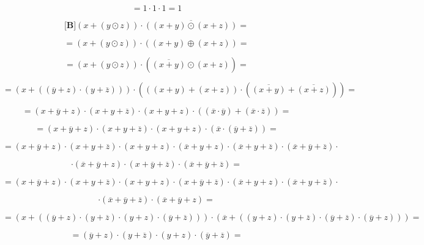 \begin{enumerate}
\begin{enumerate}
\begin{enumerate}
\begin{enumerate}
        \[{= {{1 \cdot 1} \cdot 1}} = 1\]

        \[{\lbrack\mathbf{B}\rbrack}{{{({x + {({y \odot z})}})} \cdot \overline{({{({x+y})}\odot{({x+z})}})}} =}\]

        \[{= {{({x + {({y \odot z})}})} \cdot {({{({x + y})} \oplus {({x + z})}})}}} =\]

        \[{= {{({x + {({y \odot z})}})} \cdot {({\overline{({x+y})} \odot {({x + z})}})}}} =\]

        \[{= {{({x + {({{({\overline{y} + z})} \cdot {({y + \overline{z}})}})}})} \cdot {({{({{({x + y})} + {({x + z})}})} \cdot {({\overline{({x+y})} + \overline{({x+z})}})}})}}} =\]

        \[{= {{{{({{x + \overline{y}} + z})} \cdot {({{x + y} + \overline{z}})}} \cdot {({{x + y} + z})}} \cdot \left( {\left( {\overline{x} \cdot \overline{y}} \right) + \left( {\overline{x} \cdot \overline{z}} \right)} \right)}} =\]

        \[{= {{{{({{x + \overline{y}} + z})} \cdot {({{x + y} + \overline{z}})}} \cdot {({{x + y} + z})}} \cdot {({\overline{x} \cdot {({\overline{y} + \overline{z}})}})}}} =\]

        \[= {{{{{{{({{x + \overline{y}} + z})} \cdot {({{x + y} + \overline{z}})}} \cdot {({{x + y} + z})}} \cdot {({{\overline{x} + y} + z})}} \cdot {({{\overline{x} + y} + \overline{z}})}} \cdot {({{\overline{x} + \overline{y}} + \overline{z}})}} \cdot}\]

        \[{{{\cdot {({{\overline{x} + \overline{y}} + z})}} \cdot {({{x + \overline{y}} + \overline{z}})}} \cdot {({{\overline{x} + \overline{y}} + \overline{z}})}} =\]

        \[= {{{{{{{({{x + \overline{y}} + z})} \cdot {({{x + y} + \overline{z}})}} \cdot {({{x + y} + z})}} \cdot {({{x + \overline{y}} + \overline{z}})}} \cdot {({{\overline{x} + y} + z})}} \cdot {({{\overline{x} + y} + \overline{z}})}} \cdot}\]

        \[{{\cdot {({{\overline{x} + \overline{y}} + \overline{z}})}} \cdot {({{\overline{x} + \overline{y}} + z})}} =\]

        \[{= {{({x + {({{{{({\overline{y} + z})} \cdot {({y + \overline{z}})}} \cdot {({y + z})}} \cdot {({\overline{y} + \overline{z}})}})}})} \cdot {({\overline{x} + {({{{{({y + z})} \cdot {({y + \overline{z}})}} \cdot {({\overline{y} + \overline{z}})}} \cdot {({\overline{y} + z})}})}})}}} =\]

        \[{= {{{{({\overline{y} + z})} \cdot {({y + \overline{z}})}} \cdot {({y + z})}} \cdot {({\overline{y} + \overline{z}})}}} =\]


\end{enumerate}
\end{enumerate}
\end{enumerate}
\end{enumerate}
